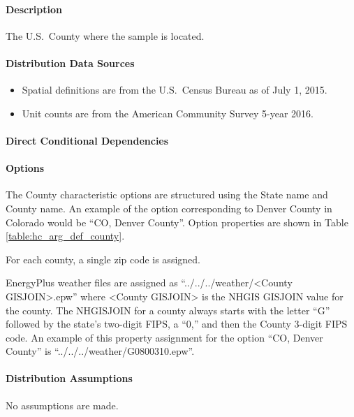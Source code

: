 \paragraph{Description}
% 
The U.S.~County where the sample is located.

\paragraph{Distribution Data Sources}
% 
\begin{itemize}
\item
  Spatial definitions are from the U.S.~Census Bureau as of July 1,
  2015.
\item
  Unit counts are from the American Community Survey 5-year 2016.
\end{itemize}

\paragraph{Direct Conditional Dependencies}


\paragraph{Options}
The County characteristic options are structured using the State name and County name. An example of the option corresponding to Denver County in Colorado would be ``CO, Denver County''. Option properties are shown in Table \ref{table:hc_arg_def_county}.

For each county, a single zip code is assigned.

EnergyPlus weather files are assigned as ``../../../weather/<County GISJOIN>.epw'' where <County GISJOIN> is the NHGIS GISJOIN value for the county. The NHGISJOIN for a county always starts with the letter ``G'' followed by the state's two-digit FIPS, a ``0,'' and then the County 3-digit FIPS code. An example of this property assignment for the option ``CO, Denver County'' is ``../../../weather/G0800310.epw''.



\paragraph{Distribution Assumptions}
% 
No assumptions are made.
